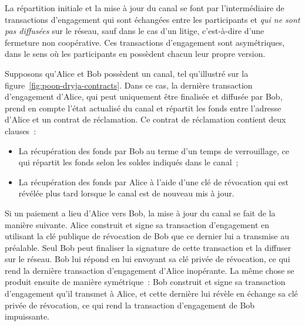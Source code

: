 %
%
%

La répartition initiale et la mise à jour du canal se font par l'intermédiaire de transactions d'engagement qui sont échangées entre les participants et \emph{qui ne sont pas diffusées} sur le réseau, sauf dans le cas d'un litige, c'est-à-dire d'une fermeture non coopérative. Ces transactions d'engagement sont asymétriques, dans le sens où les participants en possèdent chacun leur propre version.

Supposons qu'Alice et Bob possèdent un canal, tel qu'illustré sur la figure~\ref{fig:poon-dryja-contracts}. Dans ce cas, la dernière transaction d'engagement d'Alice, qui peut uniquement être finalisée et diffusée par Bob, prend en compte l'état actualisé du canal et répartit les fonds entre l'adresse d'Alice et un contrat de réclamation. Ce contrat de réclamation contient deux clauses~:

\begin{itemize}
\item La récupération des fonds par Bob au terme d'un temps de verrouillage, ce qui répartit les fonds selon les soldes indiqués dans le canal~;
\item La récupération des fonds par Alice à l'aide d'une clé de révocation qui est révélée plus tard lorsque le canal est de nouveau mis à jour.
\end{itemize}

Si un paiement a lieu d'Alice vers Bob, la mise à jour du canal se fait de la manière suivante. Alice construit et signe sa transaction d'engagement en utilisant la clé publique de révocation de Bob que ce dernier lui a transmise au préalable. Seul Bob peut finaliser la signature de cette transaction et la diffuser sur le réseau. Bob lui répond en lui envoyant sa clé privée de révocation, ce qui rend la dernière transaction d'engagement d'Alice inopérante. La même chose se produit ensuite de manière symétrique~: Bob construit et signe sa transaction d'engagement qu'il transmet à Alice, et cette dernière lui révèle en échange sa clé privée de révocation, ce qui rend la transaction d'engagement de Bob impuissante.

